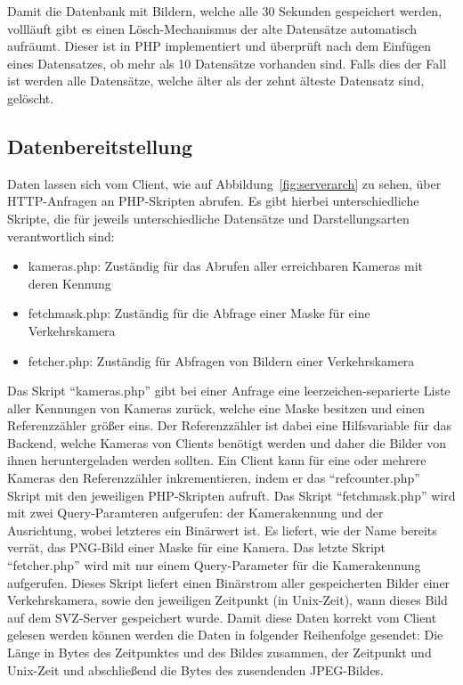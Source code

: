 Damit die Datenbank mit Bildern, welche alle 30 Sekunden gespeichert werden, vollläuft gibt es einen Lösch-Mechanismus der alte Datensätze automatisch aufräumt. 
Dieser ist in PHP implementiert und überprüft nach dem Einfügen eines Datensatzes, ob mehr als 10 Datensätze vorhanden sind.
Falls dies der Fall ist werden alle Datensätze, welche älter als der zehnt älteste Datensatz sind, gelöscht.

\subsection{Datenbereitstellung}
Daten lassen sich vom Client, wie auf Abbildung~\ref{fig:serverarch} zu sehen, über HTTP-Anfragen an PHP-Skripten abrufen. Es gibt hierbei unterschiedliche Skripte, die für jeweils unterschiedliche Datensätze und Darstellungsarten verantwortlich sind:
\begin{itemize}
\item{kameras.php: Zuständig für das Abrufen aller erreichbaren Kameras mit deren Kennung}
\item{fetchmask.php: Zuständig für die Abfrage einer Maske für eine Verkehrskamera}
\item{fetcher.php: Zuständig für Abfragen von Bildern einer Verkehrskamera}
\end{itemize}
Das Skript "`kameras.php"' gibt bei einer Anfrage eine leerzeichen-separierte Liste aller Kennungen von Kameras zurück, welche eine Maske besitzen und einen Referenzzähler größer eins. 
Der Referenzzähler ist dabei eine Hilfsvariable für das Backend, welche Kameras von Clients benötigt werden und daher die Bilder von ihnen heruntergeladen werden sollten.
Ein Client kann für eine oder mehrere Kameras den Referenzzähler inkrementieren, indem er das "`refcounter.php"' Skript mit den jeweiligen PHP-Skripten aufruft.
Das Skript "`fetchmask.php"' wird mit zwei Query-Paramteren aufgerufen: der Kamerakennung und der Ausrichtung, wobei letzteres ein Binärwert ist. 
Es liefert, wie der Name bereits verrät, das PNG-Bild einer Maske für eine Kamera.
Das letzte Skript "`fetcher.php"' wird mit nur einem Query-Parameter für die Kamerakennung aufgerufen. 
Dieses Skript liefert einen Binärstrom aller gespeicherten Bilder einer Verkehrskamera, sowie den jeweiligen Zeitpunkt (in Unix-Zeit), wann dieses Bild auf dem SVZ-Server gespeichert wurde. 
Damit diese Daten korrekt vom Client gelesen werden können werden die Daten in folgender Reihenfolge gesendet: Die Länge in Bytes des Zeitpunktes und des Bildes zusammen, der Zeitpunkt und Unix-Zeit und abschließend die Bytes des zusendenden JPEG-Bildes.
\newpage

